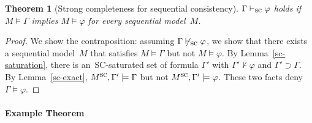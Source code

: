 \documentclass[doctor]{iscs-thesis}
\newcommand{\vdashsc}{\vdash_{\mbox{\rm sc}}}
\newtheorem{theorem}{Theorem}
\begin{document}
\begin{theorem}[Strong completeness for sequential consistency]
 \label{sc-comp}
$\Gamma\vdashsc\varphi$ holds if $M\models \Gamma$ implies $M\models\varphi$ for every
 sequential model~$M$.
\end{theorem}
\begin{proof}
 We show the contraposition: assuming $\Gamma\not\vdashsc\varphi$, we show
 that there exists a sequential model~$M$ that satisfies
 $M\models\Gamma$ but not $M\models\varphi$.
 By Lemma~\ref{sc-saturation},
 there is an~SC-saturated set of formula $\Gamma'$ with $\Gamma'\not\vdash\varphi$
 and $\Gamma'\supset\Gamma$.
 By Lemma~\ref{sc-exact},
 $M^{\mbox{sc}}, \Gamma'\models \Gamma$ but not $M^{\mbox{sc}}, \Gamma' \models \varphi$.
 These two facts deny $\Gamma\models\varphi$.
\end{proof}



\paragraph{Example Theorem}
\end{document}

